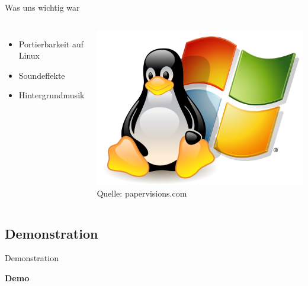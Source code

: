 \documentclass[18pt]{beamer}
\begin{document}
\begin{frame}{Was uns wichtig war}

\begin{columns}[c] 
    \begin{itemize}
	\item Portierbarkeit auf Linux
	\item Soundeffekte
	\item Hintergrundmusik
	\end{itemize}
    \includegraphics[width=\textwidth]{linux} \\
    Quelle: papervisions.com
    \end{columns}
\end{frame}



\subsection{Demonstration}
\begin{frame}{Demonstration}
\begin{center}
\Huge \textbf{Demo}
\end{center}

\end{frame}


\end{document}
